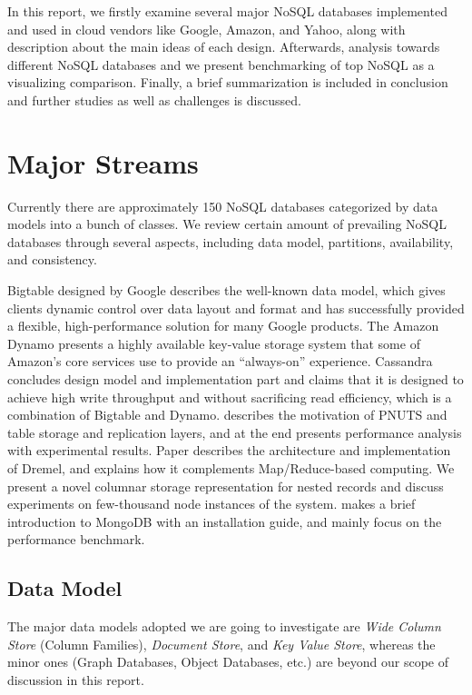 \documentclass[12pt,letter]{article}
\begin{document}
In this report, we firstly examine several major NoSQL databases implemented and used in cloud vendors like Google, Amazon, and Yahoo, along with description about the main ideas of each design. Afterwards, analysis towards different NoSQL databases and we present benchmarking of top NoSQL as a visualizing comparison. Finally, a brief summarization is included in conclusion and further studies as well as challenges is discussed.

\section{Major Streams} \label{majorstream}
Currently there are approximately 150 NoSQL databases categorized by data models into a bunch of classes.\citep{Unknown2012} We review certain amount of prevailing NoSQL databases through several aspects, including data model, partitions, availability, and consistency. 

Bigtable\citep{Chang2006} designed by Google describes the well-known data model, which gives clients dynamic control over data layout and format and has successfully provided a flexible, high-performance solution for many Google products. 
The Amazon Dynamo\citep{DeCandia2007} presents a highly available key-value storage system that some of Amazon's core services use to provide an ``always-on'' experience.
Cassandra\citep{LakshamAvinash2010} concludes design model and implementation part and claims that it is designed to achieve high write throughput and without sacrificing read efficiency, which is a combination of Bigtable and Dynamo. 
\citep{Silberstein2008} describes the motivation of PNUTS and table storage and replication layers, and at the end presents performance analysis with experimental results.  
Paper \citep{Melnik2010} describes the architecture and implementation of Dremel, and explains how it complements Map/Reduce-based computing. We present a novel columnar storage representation for nested records and discuss experiments on few-thousand node instances of the system.
\citep{Suter2012} makes a brief introduction to MongoDB with an installation guide, and mainly focus on the performance benchmark.

\subsection{Data Model} \label{datamodel}
The major data models adopted we are going to investigate are \textit{Wide Column Store} (Column Families), \textit{Document Store}, and \textit{Key Value Store}, whereas the minor ones (Graph Databases, Object Databases, etc.) are beyond our scope of discussion in this report. 
\end{document}
